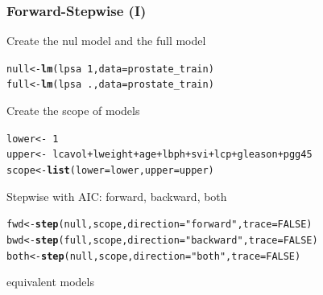 \documentclass[10pt, c, xcolor=x11names]{beamer}\usepackage[]{graphicx}\usepackage[]{color}
\makeatletter
\newcommand{\hlnum}[1]{\textcolor[rgb]{0.686,0.059,0.569}{#1}}%
\newcommand{\hlstr}[1]{\textcolor[rgb]{0.192,0.494,0.8}{#1}}%
\newcommand{\hlopt}[1]{\textcolor[rgb]{0,0,0}{#1}}%
\newcommand{\hlstd}[1]{\textcolor[rgb]{0.345,0.345,0.345}{#1}}%
\newcommand{\hlkwb}[1]{\textcolor[rgb]{0.69,0.353,0.396}{#1}}%
\newcommand{\hlkwc}[1]{\textcolor[rgb]{0.333,0.667,0.333}{#1}}%
\newcommand{\hlkwd}[1]{\textcolor[rgb]{0.737,0.353,0.396}{\textbf{#1}}}%
\newenvironment{kframe}{%
 \def\at@end@of@kframe{}%
 \ifinner\ifhmode%
  \def\at@end@of@kframe{\end{minipage}}%
  \begin{minipage}{\columnwidth}%
 \fi\fi%
 \def\FrameCommand##1{\hskip\@totalleftmargin \hskip-\fboxsep
 \colorbox{shadecolor}{##1}\hskip-\fboxsep
     \hskip-\linewidth \hskip-\@totalleftmargin \hskip\columnwidth}%
 \MakeFramed {\advance\hsize-\width
   \@totalleftmargin\z@ \linewidth\hsize
   \@setminipage}}%
 {\par\unskip\endMakeFramed%
 \at@end@of@kframe}
\newenvironment{knitrout}{}{} %
\makeatother
\begin{document}
\begin{frame}[containsverbatim]
  \frametitle{Forward-Stepwise (I)}

Create the nul model and the full model
\begin{knitrout}\scriptsize
{}\color{fgcolor}\begin{kframe}
\begin{alltt}
\hlstd{null}  \hlkwb{<-} \hlkwd{lm}\hlstd{(lpsa} \hlopt{~} \hlnum{1}\hlstd{,} \hlkwc{data} \hlstd{= prostate_train)}
\hlstd{full}  \hlkwb{<-} \hlkwd{lm}\hlstd{(lpsa} \hlopt{~} \hlstd{.,} \hlkwc{data} \hlstd{= prostate_train)}
\end{alltt}
\end{kframe}
\end{knitrout}

Create the scope of models
\begin{knitrout}\scriptsize
{}\color{fgcolor}\begin{kframe}
\begin{alltt}
\hlstd{lower} \hlkwb{<-} \hlopt{~}\hlnum{1}
\hlstd{upper} \hlkwb{<-} \hlopt{~}\hlstd{lcavol}\hlopt{+}\hlstd{lweight}\hlopt{+}\hlstd{age}\hlopt{+}\hlstd{lbph}\hlopt{+}\hlstd{svi}\hlopt{+}\hlstd{lcp}\hlopt{+}\hlstd{gleason}\hlopt{+}\hlstd{pgg45}
\hlstd{scope} \hlkwb{<-} \hlkwd{list}\hlstd{(}\hlkwc{lower} \hlstd{= lower,}\hlkwc{upper} \hlstd{= upper)}
\end{alltt}
\end{kframe}
\end{knitrout}

Stepwise with AIC: forward, backward, both
\begin{knitrout}\scriptsize
{}\color{fgcolor}\begin{kframe}
\begin{alltt}
\hlstd{fwd}  \hlkwb{<-} \hlkwd{step}\hlstd{(null, scope,} \hlkwc{direction} \hlstd{=} \hlstr{"forward"} \hlstd{,} \hlkwc{trace}\hlstd{=}\hlnum{FALSE}\hlstd{)}
\hlstd{bwd}  \hlkwb{<-} \hlkwd{step}\hlstd{(full, scope,} \hlkwc{direction} \hlstd{=} \hlstr{"backward"}\hlstd{,} \hlkwc{trace}\hlstd{=}\hlnum{FALSE}\hlstd{)}
\hlstd{both} \hlkwb{<-} \hlkwd{step}\hlstd{(null, scope,} \hlkwc{direction} \hlstd{=} \hlstr{"both"}   \hlstd{,} \hlkwc{trace}\hlstd{=}\hlnum{FALSE}\hlstd{)}
\end{alltt}
\end{kframe}
\end{knitrout}

\vfill

  equivalent models
\end{frame}
\end{document}
